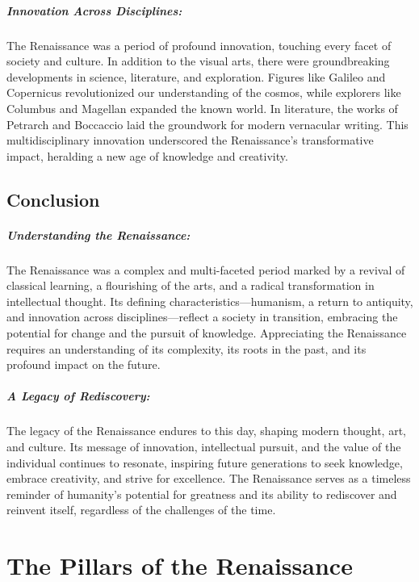 \documentclass[a4paper,12pt]{book}
\begin{document}
\paragraph{Innovation Across Disciplines:}
The Renaissance was a period of profound innovation, touching every facet of society and culture. In addition to the visual arts, there were groundbreaking developments in science, literature, and exploration. Figures like Galileo and Copernicus revolutionized our understanding of the cosmos, while explorers like Columbus and Magellan expanded the known world. In literature, the works of Petrarch and Boccaccio laid the groundwork for modern vernacular writing. This multidisciplinary innovation underscored the Renaissance's transformative impact, heralding a new age of knowledge and creativity.

\section*{Conclusion}

\paragraph{Understanding the Renaissance:}
The Renaissance was a complex and multi-faceted period marked by a revival of classical learning, a flourishing of the arts, and a radical transformation in intellectual thought. Its defining characteristics—humanism, a return to antiquity, and innovation across disciplines—reflect a society in transition, embracing the potential for change and the pursuit of knowledge. Appreciating the Renaissance requires an understanding of its complexity, its roots in the past, and its profound impact on the future.

\paragraph{A Legacy of Rediscovery:}
The legacy of the Renaissance endures to this day, shaping modern thought, art, and culture. Its message of innovation, intellectual pursuit, and the value of the individual continues to resonate, inspiring future generations to seek knowledge, embrace creativity, and strive for excellence. The Renaissance serves as a timeless reminder of humanity’s potential for greatness and its ability to rediscover and reinvent itself, regardless of the challenges of the time.

\chapter{The Pillars of the Renaissance}
\end{document}
